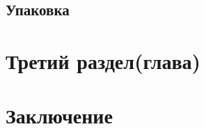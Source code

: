 \documentclass{fefu_thesis/cls/fefu}
\begin{document}
    \subsection{Упаковка}
    \section{Третий раздел(глава)}
    \section{Заключение}
    \newpage
    
    
\end{document}
